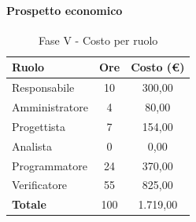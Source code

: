 \documentclass[../PianoProgetto.tex]{subfiles}
\begin{document}
	\paragraph{Prospetto economico}
					
	\begin{table}[h]
		\centering
	
		\begin{tabular}{l * {2}{c}}
			\toprule
			\textbf{Ruolo} & \textbf{Ore} & \textbf{Costo (\euro{})} \\
			\midrule
			Responsabile &	10 &  300,00 \\
			Amministratore & 4 &  80,00 \\
			Progettista & 7 & 154,00 \\
			Analista & 0 & 0,00 \\
			Programmatore & 24 & 370,00 \\
			Verificatore & 55 & 825,00 \\
			\midrule		
			\textbf{Totale} & 100 & 1.719,00 \\
			\bottomrule	
		\end{tabular}
		\caption{Fase V - Costo per ruolo}
		\label{tab:faseV_costo}
	\end{table}
\vfill	
	
\end{document}
